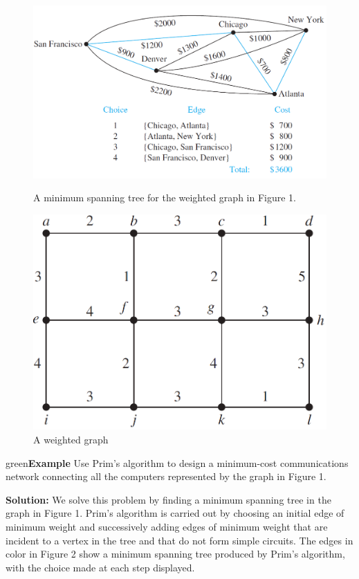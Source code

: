 \documentclass{article}
\newenvironment{example}{\begin{mybox}{green}{\textbf{Example}}}{\end{mybox}}
\begin{document}
\begin{figure}[h!]
\begin{minipage}[c]{0.50\textwidth}
    \centering
    \includegraphics[width=\textwidth]{img/ch11.5-f2.png}
    \caption{A minimum spanning tree for the weighted graph in Figure 1.}
\end{minipage}\hfill
\begin{minipage}[c]{0.40\textwidth}
    \centering
    \includegraphics[width=\textwidth]{img/ch11.5-f3.png}
    \caption{A weighted graph}
\end{minipage}\hfill
\end{figure}

\begin{example}
Use Prim’s algorithm to design a minimum-cost communications network connecting all the computers represented by the graph in Figure 1.

\textbf{Solution:}
We solve this problem by finding a minimum spanning tree in the graph in Figure 1. Prim’s algorithm is carried out by choosing an initial edge of minimum weight and successively adding edges of minimum weight that are incident to a vertex in the tree and that do not form simple circuits. The edges in color in Figure 2 show a minimum spanning tree produced by Prim’s algorithm, with the choice made at each step displayed.
\end{example}
\end{document}
